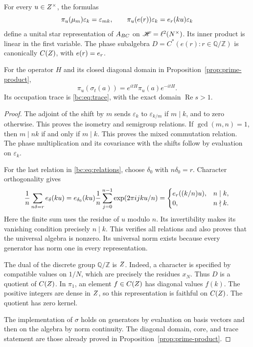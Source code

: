 \begin{proposition}\label{bc:prop:representation}
For every \(u\in Z^{\times}\), the formulas
\begin{equation}\label{bc:eq:representation}
 \pi_u(\mu_m)\varepsilon_k=\varepsilon_{mk},\qquad
 \pi_u(e(r))\varepsilon_k=e_r(ku)\varepsilon_k
\end{equation}
define a unital star representation of \(A_{BC}\) on
\(\mathscr H=\ell^2(N^{\times})\). Its inner product is linear in the first variable.
The phase subalgebra
\(D=C^*(e(r):r\in\mathbb Q/\mathbb Z)\) is canonically \(C(Z)\),
with \(e(r)=e_r\).

For the operator \(H\) and its closed diagonal domain in
Proposition~\ref{prop:prime-product},
\[
 \pi_u(\sigma_t(a))=e^{itH}\pi_u(a)e^{-itH}.
\]
Its occupation trace is \eqref{bc:eq:trace}, with the exact domain
\(\operatorname{Re}s>1\).
\end{proposition}

\begin{proof}
The adjoint of the shift by \(m\) sends \(\varepsilon_k\) to
\(\varepsilon_{k/m}\) if \(m\mid k\), and to zero otherwise.
This proves the isometry and semigroup relations. If \(\gcd(m,n)=1\),
then \(m\mid nk\) if and only if \(m\mid k\). This proves the mixed
commutation relation. The phase multiplication and its covariance with
the shifts follow by evaluation on \(\varepsilon_k\).

For the last relation in \eqref{bc:eq:relations}, choose \(\delta_0\) with
\(n\delta_0=r\). Character orthogonality gives
\[
 \frac1n\sum_{n\delta=r}e_\delta(ku)
 =e_{\delta_0}(ku)\frac1n
      \sum_{j=0}^{n-1}\exp(2\pi i jku/n)
 =\begin{cases}
   e_r((k/n)u),&n\mid k,\\
   0,&n\nmid k.
  \end{cases}
\]
Here the finite sum uses the residue of \(u\) modulo \(n\).
Its invertibility makes its vanishing condition precisely \(n\mid k\).
This verifies all relations and also proves that the universal algebra
is nonzero. Its universal norm exists because every generator has norm
one in every representation.

The dual of the discrete group \(\mathbb Q/\mathbb Z\) is \(Z\).
Indeed, a character is specified by compatible values on \(1/N\),
which are precisely the residues \(x_N\). Thus \(D\) is a quotient
of \(C(Z)\). In \(\pi_1\), an element \(f\in C(Z)\) has
diagonal values \(f(k)\). The positive integers are dense in \(Z\),
so this representation is faithful on \(C(Z)\). The quotient has
zero kernel.

The implementation of \(\sigma\) holds on generators by evaluation on
basis vectors and then on the algebra by norm continuity. The diagonal
domain, core, and trace statement are those already proved in
Proposition~\ref{prop:prime-product}.
\end{proof}

